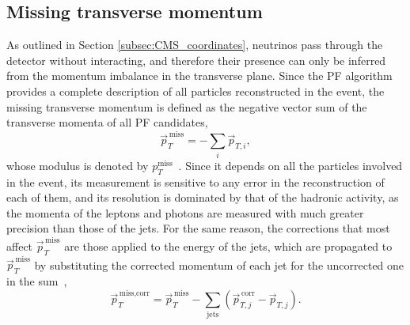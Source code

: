 




\subsection{Missing transverse momentum}
\label{subsec:MET}
%
As outlined in Section \ref{subsec:CMS_coordinates}, neutrinos pass through the detector without interacting, and therefore their presence can only be inferred from the momentum imbalance in the transverse plane. Since the PF algorithm provides a complete description of all particles reconstructed in the event, the missing transverse momentum is defined as the negative vector sum of the transverse momenta of all PF candidates,
\begin{equation}
    \vec{p}_T^{\,\text{miss}} = -\sum_{i} \vec{p}_{T,i},
    \label{eq:met}
\end{equation}
whose modulus is denoted by $p_T^\text{miss}$~\cite{CMS:2019ctu}. Since it depends on all the particles involved in the event, its measurement is sensitive to any error in the reconstruction of each of them, and its resolution is dominated by that of the hadronic activity, as the momenta of the leptons and photons are measured with much greater precision than those of the jets. For the same reason, the corrections that most affect $\vec{p}_T^{\,\text{miss}}$ are those applied to the energy of the jets, which are propagated to $\vec{p}_T^{\,\text{miss}}$ by substituting the corrected momentum of each jet for the uncorrected one in the sum~\cite{CMS:2019ctu},
\begin{equation}
    \vec{p}_T^{\,\text{miss,corr}} = \vec{p}_T^{\,\text{miss}} - \sum_{\text{jets}} \left(\vec{p}_{T,j}^{\,\text{corr}} - \vec{p}_{T,j}\right).
    \label{eq:met_corr}
\end{equation}

